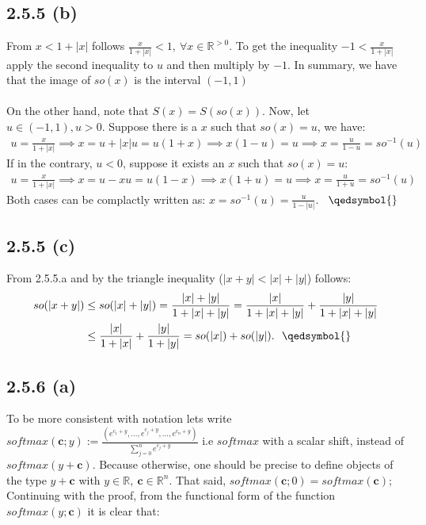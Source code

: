 \documentclass{exam}
\begin{document}
\subsection*{2.5.5 (b)}
From $x < 1 + |x|$ follows $\frac{x}{1 + |x|} < 1, \ \forall x \in \mathbb{R}^{>0}$. To get the inequality $-1 < \frac{x}{1 + |x|}$ apply the second inequality to $u$ and then 
multiply by $-1$. In summary, we have that the image of $so(x)$ is the interval $(-1,1)$\\
\\
On the other hand, note that $S(x) = S(so(x))$. Now, let $u \in (-1,1), u > 0$. Suppose there is a $x$ such that $so(x) = u$, we have:
\begin{equation*}
    \begin{aligned}
        u = \frac{x}{1 + |x|} \implies x = u + |x| u = u (1 + x) \implies x(1 - u) = u \implies x = \frac{u}{1 - u} = so^{-1}(u)
    \end{aligned}    
\end{equation*}
If in the contrary, $u < 0$, suppose it exists an $x$ such that $so(x) = u$:
\begin{equation*}
    \begin{aligned}
        u = \frac{x}{1 + |x|} \implies x = u - x u = u (1 - x) \implies x(1 + u) = u \implies x = \frac{u}{1 + u} = so^{-1}(u)
    \end{aligned}    
\end{equation*}
Both cases can be complactly written as: $x = so^{-1}(u) = \frac{u}{1 - |u|}$. \ $\qedsymbol{}$

\subsection*{2.5.5 (c)}
From 2.5.5.a and by the triangle inequality ($|x + y| < |x| + |y|$) follows:
\begin{equation*}
    \begin{aligned}
        so(|x + y|) &\leq so(|x| + |y|) = \frac{|x| + |y|}{1 + |x| + |y|} = \frac{|x|}{1 + |x| + |y|} + \frac{|y|}{1 + |x| + |y|} \\
                    &\leq \frac{|x|}{1 + |x|} + \frac{|y|}{1 + |y|} = so(|x|) + so(|y|). \ \ \qedsymbol{}
    \end{aligned}    
\end{equation*}

\subsection*{2.5.6 (a)}
To be more consistent with notation lets write $\displaystyle softmax(\pmb{\text{c}};y):= \frac{(e^{c_1 + y}, \ldots ,e^{c_j + y}, \ldots ,e^{c_n + y} )}{\displaystyle\sum^{n}_{j = 0 }e^{c_j + y}}$ i.e $softmax$ with a scalar shift, instead of $softmax(y + \pmb{\text{c}})$. Because otherwise, one should be precise 
to define objects of the type $y + \pmb{\text{c}}$ with $y \in \mathbb{R}, \ \pmb{\text{c}} \in \mathbb{R}^n$. That said, $softmax(\pmb{\text{c}};0) = softmax(\pmb{\text{c}})$; Continuing with the proof, from the functional form of the function $softmax(y;\pmb{\text{c}})$ it is clear that:
\end{document}
